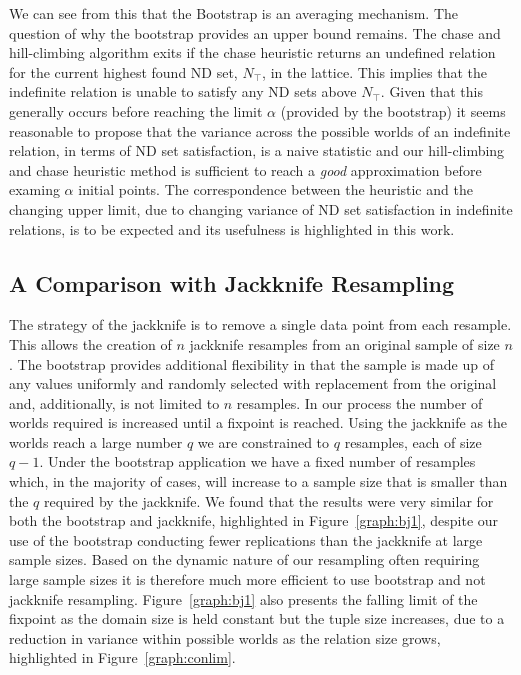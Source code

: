 We can see from this that the Bootstrap is an averaging mechanism.
The question of why the bootstrap provides an upper bound remains.
The chase and hill-climbing algorithm exits if the chase heuristic
returns an undefined relation for the current highest found ND set,
$N_{\top}$, in
the lattice. This implies that the indefinite relation is unable to
satisfy any ND sets above $N_{\top}$. Given that this generally occurs
before reaching the limit $\alpha$ (provided by the bootstrap) it
seems reasonable to propose that the variance across the possible
worlds of an indefinite relation, in terms of ND set satisfaction,
is a naive statistic and our hill-climbing and chase heuristic method
is sufficient to reach a {\em good} approximation before examing
$\alpha$ initial points.  The correspondence between the heuristic and
the changing upper limit, due to changing variance of ND set
satisfaction in indefinite relations, is to be expected and its usefulness
is highlighted in this work.


\subsection{A Comparison with Jackknife
Resampling}\label{subsec:cp_jackcomparison}  


The strategy of the jackknife is to remove a single data point from each
resample. This allows the creation of $n$ jackknife resamples from an
original sample of size $n$.  The bootstrap provides additional flexibility
in that the sample is made up of any values uniformly and randomly selected
with replacement from the original and, additionally, is not limited to
$n$ resamples.  In our process the number of worlds required is increased
until a fixpoint is reached. Using the jackknife as the worlds reach a
large number $q$ we are constrained to $q$ resamples, each of size $q-1$.
Under the bootstrap application we have a fixed number of resamples which,
in the majority of cases,
will increase to a sample size that is smaller than the $q$ required by the 
jackknife. We found
that the results were very similar for both the bootstrap and jackknife, 
highlighted in Figure~\ref{graph:bj1}, 
despite our use of the bootstrap conducting fewer replications than the
jackknife at large sample sizes. Based on the dynamic nature of our
resampling often requiring large sample sizes it is therefore much
more efficient to use bootstrap and not jackknife resampling. 
Figure~\ref{graph:bj1} also presents
the falling limit of the fixpoint as the domain size is held constant but
the tuple size increases, due to a reduction in variance within
possible worlds as the relation size grows, highlighted in
Figure~\ref{graph:conlim}.


